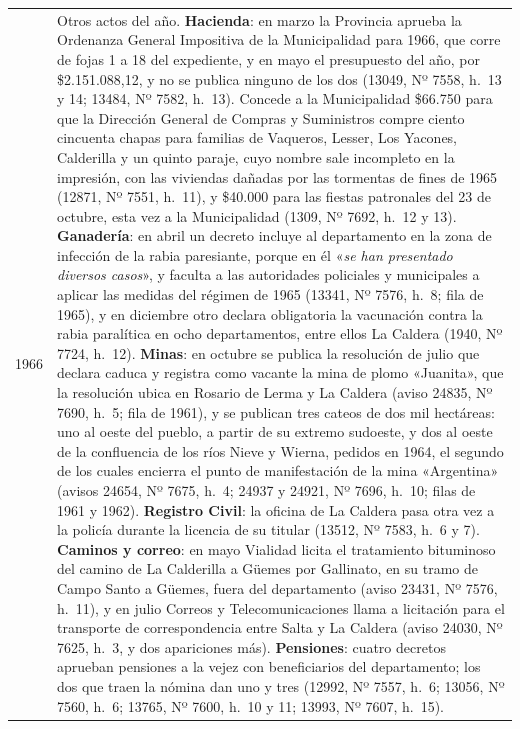 \begin{longtable}{@{}p{2.7cm}p{10.3cm}@{}}
1966 & Otros actos del año. \textbf{Hacienda}: en marzo la Provincia aprueba la Ordenanza General Impositiva de la Municipalidad para 1966, que corre de fojas 1 a 18 del expediente, y en mayo el presupuesto del año, por \$2.151.088,12, y no se publica ninguno de los dos (13049, Nº 7558, h.\ 13 y 14; 13484, Nº 7582, h.\ 13). Concede a la Municipalidad \$66.750 para que la Dirección General de Compras y Suministros compre ciento cincuenta chapas para familias de Vaqueros, Lesser, Los Yacones, Calderilla y un quinto paraje, cuyo nombre sale incompleto en la impresión, con las viviendas dañadas por las tormentas de fines de 1965 (12871, Nº 7551, h.\ 11), y \$40.000 para las fiestas patronales del 23 de octubre, esta vez a la Municipalidad (1309, Nº 7692, h.\ 12 y 13). \textbf{Ganadería}: en abril un decreto incluye al departamento en la zona de infección de la rabia paresiante, porque en él «\textit{se han presentado diversos casos}», y faculta a las autoridades policiales y municipales a aplicar las medidas del régimen de 1965 (13341, Nº 7576, h.\ 8; fila de 1965), y en diciembre otro declara obligatoria la vacunación contra la rabia paralítica en ocho departamentos, entre ellos La Caldera (1940, Nº 7724, h.\ 12). \textbf{Minas}: en octubre se publica la resolución de julio que declara caduca y registra como vacante la mina de plomo «Juanita», que la resolución ubica en Rosario de Lerma y La Caldera (aviso 24835, Nº 7690, h.\ 5; fila de 1961), y se publican tres cateos de dos mil hectáreas: uno al oeste del pueblo, a partir de su extremo sudoeste, y dos al oeste de la confluencia de los ríos Nieve y Wierna, pedidos en 1964, el segundo de los cuales encierra el punto de manifestación de la mina «Argentina» (avisos 24654, Nº 7675, h.\ 4; 24937 y 24921, Nº 7696, h.\ 10; filas de 1961 y 1962). \textbf{Registro Civil}: la oficina de La Caldera pasa otra vez a la policía durante la licencia de su titular (13512, Nº 7583, h.\ 6 y 7). \textbf{Caminos y correo}: en mayo Vialidad licita el tratamiento bituminoso del camino de La Calderilla a Güemes por Gallinato, en su tramo de Campo Santo a Güemes, fuera del departamento (aviso 23431, Nº 7576, h.\ 11), y en julio Correos y Telecomunicaciones llama a licitación para el transporte de correspondencia entre Salta y La Caldera (aviso 24030, Nº 7625, h.\ 3, y dos apariciones más). \textbf{Pensiones}: cuatro decretos aprueban pensiones a la vejez con beneficiarios del departamento; los dos que traen la nómina dan uno y tres (12992, Nº 7557, h.\ 6; 13056, Nº 7560, h.\ 6; 13765, Nº 7600, h.\ 10 y 11; 13993, Nº 7607, h.\ 15). \\

\end{longtable}
